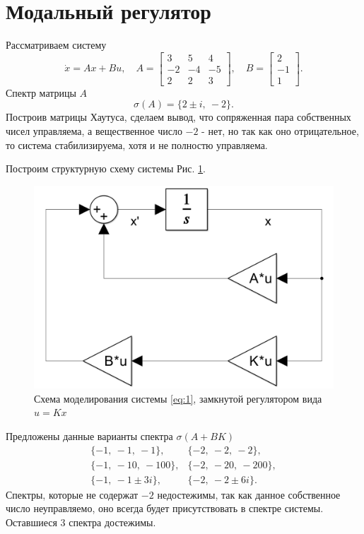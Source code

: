 \section{Модальный регулятор}

Рассматриваем систему
\begin{equation}
    \dot x = Ax+Bu,\quad
    A=\begin{bmatrix}
        3 & 5 & 4 \\
        -2 & -4 & -5 \\
        2 & 2 & 3
    \end{bmatrix},\quad
    B=\begin{bmatrix}
        2 \\ -1 \\ 1
    \end{bmatrix}.
    \label{eq:1}
\end{equation}
Спектр матрицы $A$
\begin{equation*}
    \sigma(A)=\{2\pm i,\ -2\}.
\end{equation*}
Построив матрицы Хаутуса, сделаем вывод, что сопряженная пара
собственных чисел управляема, а вещественное число $-2$ - нет,
но так как оно отрицательное, то система стабилизируема, хотя и
не полностю управляема. 

Построим структурную схему системы Рис. \ref{fig:1}.
\begin{figure}[H]
    \centering
    \includegraphics[width=0.7\linewidth]{figs/task1_slx.png}
    \caption{Схема моделирования системы \ref{eq:1}, замкнутой
    регулятором вида $u=Kx$}
    \label{fig:1}
\end{figure}
Предложены данные варианты спектра $\sigma(A+BK)$
\begin{equation*}
    \begin{array}{rl}
        \{-1,\ -1,\ -1\}, & \{-2,\ -2,\ -2\}, \\
        \{-1,\ -10,\ -100\}, & \{-2,\ -20,\ -200\}, \\
        \{-1,\ -1\pm 3i\}, & \{-2,\ -2\pm 6i\}.
    \end{array}
\end{equation*}
Спектры, которые не содержат $-2$ недостежимы, так как
данное собственное число неуправляемо, оно всегда будет
присутствовать в спектре системы. Оставшиеся
3 спектра достежимы.